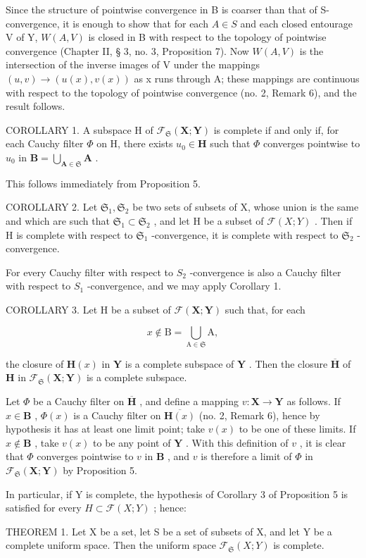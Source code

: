 Since the structure of pointwise convergence in B is coarser than that of S-convergence, it is enough to show that for each \(A \in S\) and each closed entourage V of Y, \(W(A, V)\) is closed in B with respect to the topology of pointwise convergence (Chapter II, § 3, no. 3, Proposition 7). Now \(W(A, V)\) is the intersection of the inverse images of V under the mappings \((u, v) \to (u(x), v(x))\) as x runs through A; these mappings are continuous with respect to the topology of pointwise convergence (no. 2, Remark 6), and the result follows.

COROLLARY 1. A subspace H of \(\mathcal{F}_{\mathfrak{S}}(\mathbf{X};\mathbf{Y})\) is complete if and only if, for each Cauchy filter \(\Phi\) on H, there exists \(u_0\in \mathbf{H}\) such that \(\Phi\) converges pointwise to \(u_0\) in \(\mathbf{B} = \bigcup_{\mathbf{A}\in \mathfrak{S}}\mathbf{A}\) .

This follows immediately from Proposition 5.

COROLLARY 2. Let \(\mathfrak{S}_1, \mathfrak{S}_2\) be two sets of subsets of X, whose union is the same and which are such that \(\mathfrak{S}_1 \subset \mathfrak{S}_2\) , and let H be a subset of \(\mathcal{F}(X; Y)\) . Then if H is complete with respect to \(\mathfrak{S}_1\) -convergence, it is complete with respect to \(\mathfrak{S}_2\) -convergence.

For every Cauchy filter with respect to \(S_{2}\) -convergence is also a Cauchy filter with respect to \(S_{1}\) -convergence, and we may apply Corollary 1.

COROLLARY 3. Let H be a subset of \(\mathcal{F}(\mathbf{X};\mathbf{Y})\) such that, for each

\[
x \notin \mathrm{B} = \bigcup_ {\mathrm{A} \in \mathfrak {S}} \mathrm{A},
\]

the closure of \(\mathbf{H}(x)\) in \(\mathbf{Y}\) is a complete subspace of \(\mathbf{Y}\) . Then the closure \(\overline{\mathbf{H}}\) of \(\mathbf{H}\) in \(\mathcal{F}_{\mathfrak{S}}(\mathbf{X};\mathbf{Y})\) is a complete subspace.

Let \(\Phi\) be a Cauchy filter on \(\overline{\mathbf{H}}\) , and define a mapping \(v: \mathbf{X} \to \mathbf{Y}\) as follows. If \(x \in \mathbf{B}\) , \(\Phi(x)\) is a Cauchy filter on \(\overline{\mathbf{H}(x)}\) (no. 2, Remark 6), hence by hypothesis it has at least one limit point; take \(v(x)\) to be one of these limits. If \(x \notin \mathbf{B}\) , take \(v(x)\) to be any point of \(\mathbf{Y}\) . With this definition of \(v\) , it is clear that \(\Phi\) converges pointwise to \(v\) in \(\mathbf{B}\) , and \(v\) is therefore a limit of \(\Phi\) in \(\mathcal{F}_{\mathfrak{S}}(\mathbf{X}; \mathbf{Y})\) by Proposition 5.

In particular, if Y is complete, the hypothesis of Corollary 3 of Proposition 5 is satisfied for every \(H \subset \mathcal{F}(X; Y)\) ; hence:

THEOREM 1. Let X be a set, let S be a set of subsets of X, and let Y be a complete uniform space. Then the uniform space \(\mathcal{F}_{\mathfrak{S}}(X;Y)\) is complete.
